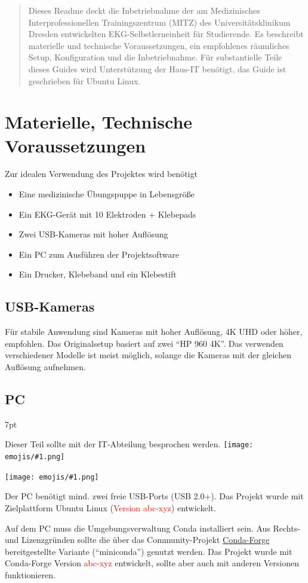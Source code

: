 \documentclass[a4paper]{article}
\newcommand{\warn}[1]{\textcolor{red}{#1}}
\newcommand{\emoji}[1]{
    \begingroup\normalfont
    \texttt{[image: emojis/\#1.png]}
    \endgroup
}
\newenvironment{formal}{%
    \def\FrameCommand{%
    \hspace{1pt}%
    {\color{coolpurple}\vrule width 2pt}%
    {\color{formalshade}\vrule width 4pt}%
    \colorbox{formalshade}%
    }%
    \MakeFramed{\advance\hsize-\width\FrameRestore}%
    \noindent\hspace{-4.55pt}%
    \begin{adjustwidth}{}{7pt}%
    \vspace{2pt}\vspace{2pt}%
}
{%
    \vspace{2pt}\end{adjustwidth}\endMakeFramed%
}
\begin{document}
\begin{abstract}
    Dieses Readme deckt die Inbetriebnahme der am Medizinisches Interprofessionellen Trainingszentrum (MITZ) des Universitätsklinikum Dresden entwickelten EKG-Selbstlerneinheit für Studierende. Es beschreibt materielle und technische Voraussetzungen, ein empfohlenes räumliches Setup, Konfiguration und die Inbetriebnahme.
    Für substantielle Teile dieses Guides wird Unterstützung der Haus-IT benötigt, das Guide ist geschrieben für Ubuntu Linux.
\end{abstract}

\section{Materielle, Technische Voraussetzungen}
\label{sec:prerequisites}
Zur idealen Verwendung des Projektes wird benötigt
\begin{itemize}
    \item Eine medizinische Übungspuppe in Lebensgröße
    \item Ein EKG-Gerät mit 10 Elektroden + Klebepads
    \item Zwei USB-Kameras mit hoher Auflösung
    \item Ein PC zum Ausführen der Projektsoftware
    \item Ein Drucker, Klebeband und ein Klebestift
\end{itemize}

\subsection{USB-Kameras}
Für stabile Anwendung sind Kameras mit hoher Auflösung, 4K UHD oder höher, empfohlen. Das Originalsetup basiert auf zwei \enquote{HP 960 4K}. Das verwenden verschiedener Modelle ist meist möglich, solange die Kameras mit der gleichen Auflösung aufnehmen.


\subsection{PC}
\begin{formal}
    Dieser Teil sollte mit der IT-Abteilung besprochen werden.\emoji{technologist}\emoji{warning}
\end{formal}
Der PC benötigt mind. zwei freie USB-Ports (USB 2.0+). Das Projekt wurde mit Zielplattform Ubuntu Linux (\warn{Version abc-xyz}) entwickelt.

Auf dem PC muss die Umgebungsverwaltung Conda installiert sein. Aus Rechts- und Lizenzgründen sollte die über das Community-Projekt \href{https://conda-forge.org/}{Conda-Forge} bereitgestellte Variante (\enquote{miniconda}) genutzt werden. Das Projekt wurde mit Conda-Forge Version \warn{abc-xyz} entwickelt, sollte aber auch mit anderen Versionen funktionieren.
\end{document}
